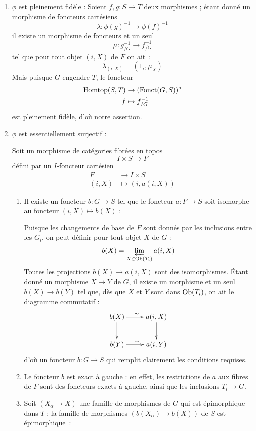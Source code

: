 \begin{enumerate}
    \item[(i)] $\phi$ est pleinement fidèle : 
    Soient $f, g: S \to T$ deux morphismes ; étant donné un morphisme de foncteurs cartésiens
    $$
    \lambda: \phi(g)^{-1} \to \phi(f)^{-1}
    $$
    il existe un morphisme de foncteurs et un seul
    $$
    \mu: g^{-1}_{/G} \to f^{-1}_{/G}
    $$
    tel que pour tout objet $(i, X)$ de $F$ on ait~: 
    $$
    \lambda_{(i, X)} = (1_i, \mu_X)
    $$
    Mais puisque $G$ engendre $T$, le foncteur
    \begin{align*}
    \operatorname{Homtop}(S, T) & \to (\operatorname{Fonct}(G, S))^\circ \\
    f & \mapsto f^{-1}_{/G}
    \end{align*}
    est pleinement fidèle, d'où notre assertion.
    \item[(ii)] $\phi$ est essentiellement surjectif : 
    
    Soit un morphisme de catégories fibrées en topos
    $$
    I \times S \to F
    $$
    défini par un $I$-foncteur cartésien
    \begin{align*}
    F &\to I \times S\\
    (i, X) & \mapsto (i, a(i, X))
    \end{align*}
    \begin{enumerate}
        \item[a)] Il existe un foncteur $b: G \to S$ tel que le foncteur $a: F \to S$ soit isomorphe au foncteur $(i, X) \mapsto b(X)$ :
        
        Puisque les changements de base de $F$ sont donnés par les inclusions entre les $G_i$, on peut définir pour tout objet $X$ de $G$ :
        $$
        b(X) = \varprojlim_{X \in \operatorname{Ob}(T_i)} a(i, X)
        $$
    Toutes les projections $b(X) \to a(i, X)$ sont des isomorphismes. Étant donné un morphisme $X \to Y$ de $G$, il existe un morphisme et un seul $b(X) \to b(Y)$ tel que, dès que $X$ et $Y$ sont dans $\operatorname{Ob}(T_i)$, on ait le diagramme commutatif :
    $$
        \xymatrix{
            b(X) \ar[r]^\sim \ar[d] & a(i,X) \ar[d]\\
            b(Y) \ar[r]^\sim & a(i,Y)
        }
    $$
     d'où un foncteur $b: G\to S$ qui remplit clairement les conditions requises.
     \item[b)] Le foncteur $b$ est exact à gauche : en effet, les restrictions de $a$ aux fibres de $F$ sont des foncteurs exacts à gauche, ainsi que les inclusions $T_i \to G$.
     \item[c)] Soit $(X_\alpha \to X)$ une famille de morphismes de $G$ qui est épimorphique dans $T$ ; la famille de morphismes $(b(X_\alpha) \to b(X))$ de $S$ est épimorphique~:
     

\end{enumerate}
\end{enumerate}
